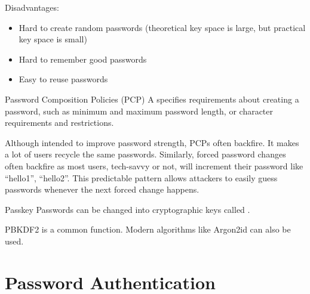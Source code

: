 \documentclass[12pt]{report}
\begin{document}
Disadvantages:
\begin{itemize}
    \item Hard to create random passwords (theoretical key space is large, but practical key space is small)
    \item Hard to remember good passwords
    \item Easy to reuse passwords
\end{itemize}

\begin{dfnbox}{Password Composition Policies (PCP)}{}
    A  specifies requirements about creating a password, such as minimum and maximum password length, or character requirements and restrictions.
\end{dfnbox}

Although intended to improve password strength, PCPs often backfire. It makes a lot of users recycle the same passwords. Similarly, forced password changes often backfire as most users, tech-savvy or not, will increment their password like ``hello1'', ``hello2''. This predictable pattern allows attackers to easily guess passwords whenever the next forced change happens.

\begin{dfnbox}{Passkey}{}
    Passwords can be changed into cryptographic keys called .
\end{dfnbox}

PBKDF2 is a common function. Modern algorithms like Argon2id can also be used.

\section{Password Authentication}
\end{document}
